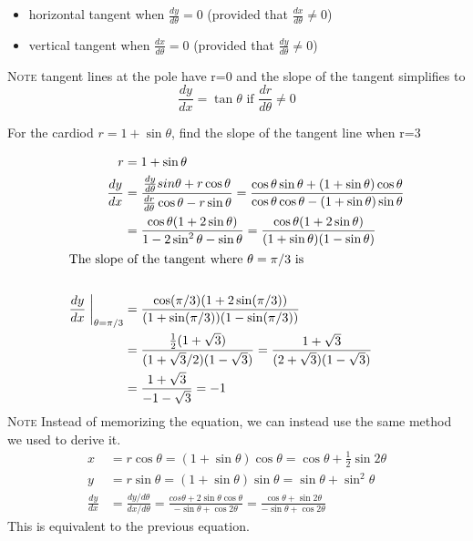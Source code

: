     \begin{itemize}
      \item horizontal tangent when $ \frac{dy}{d\theta} = 0 $ (provided that $\frac{dx}{d\theta} \neq 0$)
      \item vertical tangent when $ \frac{dx}{d\theta} = 0 $ (provided that $\frac{dy}{d\theta} \neq 0$)
    \end{itemize}
    \textsc{Note} tangent lines at the pole have r=0 and the slope of the tangent simplifies to
    \begin{equation*}
       \frac{dy}{dx}=\tan\theta \text{ if } \frac{dr}{d\theta} \neq 0
    \end{equation*}
    \begin{example}
      For the cardiod $r=1+\sin\theta$, find the slope of the tangent line when r=3
    \end{example}
    \begin{solution}
      \begin{align*}
        r &= 1+\sin\theta \\
        \frac{dy}{dx} &= \frac{\frac{dy}{d\theta}sin\theta+r\cos\theta}{\frac{dr}{d\theta}\cos\theta-r\sin\theta}
          = \frac{\cos\theta\sin\theta+(1+\sin\theta)\cos\theta}{\cos\theta\cos\theta-(1+\sin\theta)\sin\theta} \\
          &= \frac{\cos\theta(1+2\sin\theta)}{1-2\sin^2 \theta-\sin\theta}
          =\frac{\cos\theta(1+2\sin\theta)}{(1+\sin\theta)(1-\sin\theta)} \\
        \intertext{The slope of the tangent where $\theta=\pi/3$ is}  \\
        \frac{dy}{dx}\biggm\rvert_{\theta=\pi/3} &= \frac{\cos(\pi/3)(1+2\sin(\pi/3))}{(1+\sin(\pi/3))(1-\sin(\pi/3))} \\
          &= \frac{\frac{1}{2}(1+\sqrt{3})}{(1+\sqrt{3}/2)(1-\sqrt{3})} = \frac{1+\sqrt{3}}{(2+\sqrt{3})(1-\sqrt{3})} \\
          &= \frac{1+\sqrt{3}}{-1-\sqrt{3}} = -1
      \end{align*}
      \textsc{Note} Instead of memorizing the equation, we can instead use the same method we used to derive it.
      \begin{align*}
        x &= r\cos\theta = (1+\sin\theta)\cos\theta = \cos\theta+\frac{1}{2}\sin2\theta \\
        y &= r\sin\theta = (1+\sin\theta)\sin\theta = \sin\theta+\sin^2 \theta \\
        \frac{dy}{dx} &= \frac{dy/d\theta}{dx/d\theta} = \frac{cos\theta+2\sin\theta\cos\theta}{-\sin\theta+\cos2\theta} = \frac{\cos\theta+\sin2\theta}{-\sin\theta+\cos2\theta}
      \end{align*}
      This is equivalent to the previous equation.
    \end{solution}


